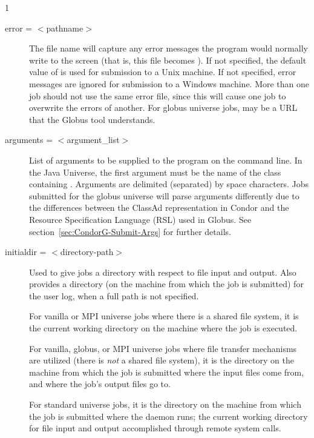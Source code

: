\begin{ManPage}{\label{man-condor-submit}}{1}
\begin{description}

\item[error = $<$pathname$>$]
The  file name will capture any
error messages the program would normally write to the screen
(that is, this file becomes ).
If not specified, the default value of
 is used for submission to a Unix machine.
If not specified, error messages are ignored
for submission to a Windows machine.
More than one job should not use the same error file, since
this will cause one job to overwrite the errors of another.
For globus universe jobs,  may be a URL that the Globus
tool  understands.


\item[arguments = $<$argument\_list$>$]
List of arguments to be supplied
to the program on the command line.   In the Java Universe, the first
argument must be the name of the class containing .
Arguments are delimited (separated) by space characters.
Jobs submitted for the globus universe will parse arguments
differently 
due to the differences between the ClassAd representation in Condor and 
the Resource Specification Language (RSL) used in Globus.
See section~\ref{sec:CondorG-Submit-Args} for further details.


\item[initialdir = $<$directory-path$>$] 
Used to give jobs a directory with respect to file input and output.
Also provides a directory 
(on the machine from which the job is submitted)
for the user log, when a full path is not specified. 

For vanilla or MPI universe jobs where there is a shared file system,
it is the current working directory on the machine where the
job is executed.

For vanilla, globus, or MPI universe jobs where file transfer mechanisms are
utilized (there is \emph{not} a shared file system),
it is the directory on the machine from which the job is submitted
where the input files come from, and where the job's output
files go to.

For standard universe jobs,
it is the directory on the machine from which the job is submitted
where the  daemon runs;
the current working directory for file input and output accomplished
through remote system calls.


\end{description}
\end{ManPage}
